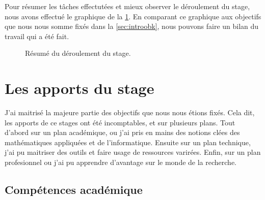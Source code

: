 \vspace*{0.50cm}
Pour résumer les tâches effectutées et mieux observer le déroulement du stage, nous avons effectué le graphique de la \cref{fig:timeline}. En comparant ce graphique aux objectifs que nous nous somme fixés dans la \cref{sec:introobk}, nous pouvons faire un bilan du travail qui a été fait.

\begin{figure}[!h]
    \centering
    \caption{Résumé du déroulement du stage.}
    \label{fig:timeline}
\end{figure}








\section{Les apports du stage}


J'ai maitrisé la majeure partie des objectifs que nous nous étions fixés. Cela dit, les apports de ce stages ont été incomptables, et sur plusieurs plans. Tout d'abord sur un plan académique, ou j'ai pris en mains des notions clées des mathématiques appliquées et de l'informatique. Ensuite sur un plan technique, j'ai pu maitriser des outils et faire usage de ressources varirées. Enfin, sur un plan profesionnel ou j'ai pu apprendre d'avantage sur le monde de la recherche.



\subsection{Compétences académique}

